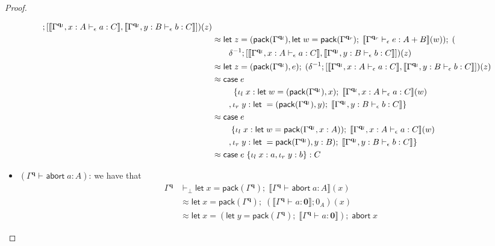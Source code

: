 \documentclass[acmsmall,screen,review]{acmart}
\newcommand{\mb}[1]{\ensuremath{\mathbf{#1}}}
\newcommand{\ms}[1]{\ensuremath{\mathsf{#1}}}
\newcommand{\lto}{:}
\newcommand{\linl}[1]{\iota_l\;{#1}}
\newcommand{\linr}[1]{\iota_r\;{#1}}
\newcommand{\labort}[1]{\ms{abort}\;{#1}}
\newcommand{\letexpr}[3]{\ensuremath{\ms{let}\;#1 = #2;\;#3}}
\newcommand{\caseexpr}[5]{\ms{case}\;#1\;\{\linl{#2} \lto #3, \linr{#4} \lto #5\}}
\newcommand{\hasty}[4]{#1 \vdash_{#2} #3: {#4}}
\newcommand{\dnt}[1]{\llbracket{#1}\rrbracket}
\begin{document}
\begin{proof}
\begin{itemize}
\begin{align*}
{        ; [
          \dnt{\hasty{\Gamma^{\mb{q}_l}, x : A}{\epsilon}{a}{C}},
          \dnt{\hasty{\Gamma^{\mb{q}_l}, y : B}{\epsilon}{b}{C}}
        ])(z)}
      \\ &\approx
      \letexpr{z}{(\ms{pack}(\Gamma^{\mb{q}_l}), 
        \letexpr{w}{\ms{pack}(\Gamma^{\mb{q}_r})}{
          \dnt{\hasty{\Gamma^{\mb{q}_r}}{\epsilon}{e}{A + B}}(w)})}{(  \\ & \qquad
        \delta^{-1}
        ; [
          \dnt{\hasty{\Gamma^{\mb{q}_l}, x : A}{\epsilon}{a}{C}},
          \dnt{\hasty{\Gamma^{\mb{q}_l}, y : B}{\epsilon}{b}{C}}
        ])(z)}
      \\ &\approx
      \letexpr{z}{(\ms{pack}(\Gamma^{\mb{q}_l}), e)}{(
        \delta^{-1}
        ; [
          \dnt{\hasty{\Gamma^{\mb{q}_l}, x : A}{\epsilon}{a}{C}},
          \dnt{\hasty{\Gamma^{\mb{q}_l}, y : B}{\epsilon}{b}{C}}
        ])(z)}
      \\ &\approx
      \caseexpr{e \\ & \qquad\;}
        {x}{\letexpr{w}{(\ms{pack}(\Gamma^{\mb{q}_l}), x)}{
          \dnt{\hasty{\Gamma^{\mb{q}_l}, x : A}{\epsilon}{a}{C}}(w)} \\ & \qquad}
        {y}{\letexpr{}{(\ms{pack}(\Gamma^{\mb{q}_l}), y)}{
          \dnt{\hasty{\Gamma^{\mb{q}_l}, y : B}{\epsilon}{b}{C}}}}
      \\ &\approx
      \caseexpr{e \\ & \qquad}
        {x}{\letexpr{w}{\ms{pack}(\Gamma^{\mb{q}_l}, x : A))}{
          \dnt{\hasty{\Gamma^{\mb{q}_l}, x : A}{\epsilon}{a}{C}}(w)} \\ & \qquad}
        {y}{\letexpr{}{\ms{pack}(\Gamma^{\mb{q}_l}), y : B)}{
          \dnt{\hasty{\Gamma^{\mb{q}_l}, y : B}{\epsilon}{b}{C}}}}
      \\ &\approx
      \caseexpr{e}{x}{a}{y}{b} : C
    \end{align*}
    \item $(\hasty{\Gamma^{\mb{q}}}{}{\labort{a}}{A})$: we have that
    \begin{align*}
    \Gamma^{\mb{q}} &\vdash_\bot
      \letexpr{x}{\ms{pack}(\Gamma^{\mb{q}})}{\dnt{\hasty{\Gamma^{\mb{q}}}{}{\labort{a}}{A}}(x)}
      \\ &\approx 
      \letexpr{x}{\ms{pack}(\Gamma^{\mb{q}})}
        {(\dnt{\hasty{\Gamma^{\mb{q}}}{}{a}{\mb{0}}} ; 0_A)(x)}
      \\ &\approx
      \letexpr{x}{(\letexpr{y}{\ms{pack}(\Gamma^{\mb{q}})}
          {\dnt{\hasty{\Gamma^{\mb{q}}}{}{a}{\mb{0}}}})}
        {\labort{x}} 

\end{align*}
\end{itemize}
\end{proof}
\end{document}
